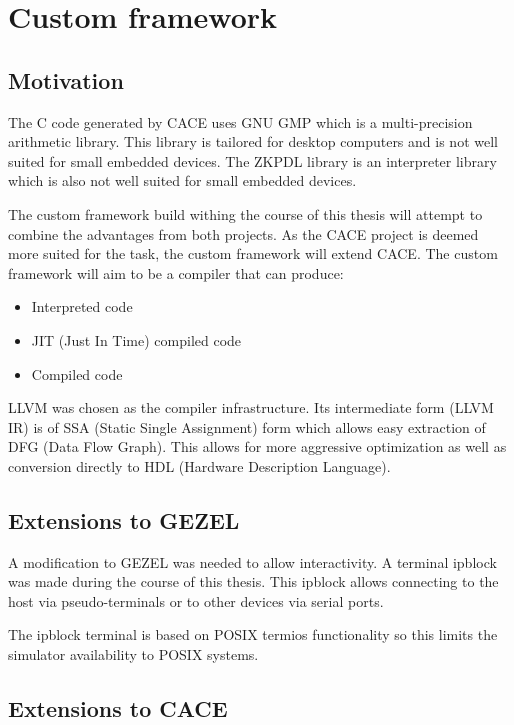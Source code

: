 \chapter{Custom framework}

\section{Motivation}

The C code generated by CACE uses GNU GMP which is a multi-precision
arithmetic library. This library is tailored for desktop computers
and is not well suited for small embedded devices. The ZKPDL library
is an interpreter library which is also not well suited for small
embedded devices.

The custom framework build withing the course of this thesis will
attempt to combine the advantages from both projects. As the CACE
project is deemed more suited for the task, the custom framework
will extend CACE. The custom framework will aim to be a compiler
that can produce:
\begin{itemize}
\item Interpreted code
\item JIT (Just In Time) compiled code
\item Compiled code
\end{itemize}

LLVM was chosen as the compiler infrastructure. Its intermediate
form (LLVM IR) is of SSA (Static Single Assignment) form which
allows easy extraction of DFG (Data Flow Graph). This allows
for more aggressive optimization as well as conversion directly
to HDL (Hardware Description Language).

\filbreak

\section{Extensions to GEZEL}

A modification to GEZEL was needed to allow interactivity. A terminal
ipblock was made during the course of this thesis. This ipblock allows
connecting to the host via pseudo-terminals or to other devices via
serial ports.

The ipblock terminal is based on POSIX termios functionality so this
limits the simulator availability to POSIX systems.

\section{Extensions to CACE}

